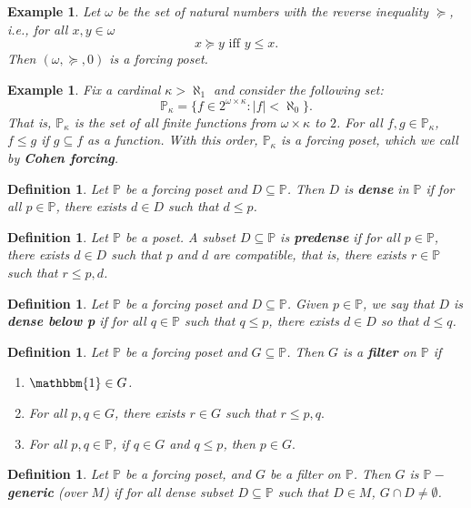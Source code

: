 \documentclass[10pt,longbibliography]{article}
\newtheorem{Def}[Theo]{Definition}
\newtheorem{Ex}[Theo]{Example}
\newcommand{\One}{\mathbbm{1}}
\newcommand{\Po}{\mathbb{P}}
\newcommand{\N}{\omega}
\newcommand{\Pk}{\mathbb{P}_{\kappa}}
\begin{document}
\begin{Ex}
	Let $\N$ be the set of natural numbers with the reverse inequality $\succcurlyeq$, i.e., for all $x,y \in \N$
	$$x \succcurlyeq y \text{ iff } y \leq x.$$
	Then $(\N,\succcurlyeq,0)$ is a forcing poset.
\end{Ex}

\begin{Ex}\label{Cohenforcingdef}
	Fix a cardinal $\kappa > \aleph_{1}$ and consider the following set:
	$$\Pk= \{ f \in 2^{\omega \times \kappa}: |f| < \aleph_{0} \}.$$
	That is, $\Pk$ is the set of all finite functions from $ \omega \times \kappa$ to $2$. For all $f,g \in \Pk$, $f \leq g$ if $g \subseteq f$ as a function. With this order, $\Pk$ is a forcing poset, which we call by \textbf{Cohen forcing}.
\end{Ex}

\begin{Def}
	Let $\Po$ be a forcing poset and $D \subseteq \Po$. Then $D$ is \textbf{dense} in $\Po$ if for all $p \in \Po$, there exists $d \in D$ such that $d \leq p$. 
\end{Def}

\begin{Def}
	Let $\Po$ be a poset. A subset $D \subseteq \Po$ is \textbf{predense} if for all $p \in \Po$, there exists $d \in D$ such that $p$ and $d$ are compatible, that is, there exists $r \in \Po$ such that $r \leq p,d$.
\end{Def}


\begin{Def}
	Let $\Po$ be a forcing poset and $D \subseteq \Po$. Given $p \in \Po$, we say that $D$ is \textbf{dense below p} if for all $q \in \Po$ such that $q \leq p$, there exists $d \in D$ so that $d \leq q$.
\end{Def}

\begin{Def}
	Let $\Po$ be a forcing poset and $G \subseteq \Po$. Then $G$ is a \textbf{filter} on $\Po$ if
	
	\begin{enumerate}
		\item $\One \in G$.
		\item For all $p,q \in G$, there exists $r \in G$ such that $r \leq p,q.$
		\item For all $p, q \in \Po$, if $q \in G$ and $q \leq p$, then $p \in G.$
	\end{enumerate}
\end{Def}

\begin{Def}
	Let $\Po$ be a forcing poset, and $G$ be a filter on $\Po$. Then $G$ is $\Po-$\textbf{generic} (over $M$) if for all dense subset $ D \subseteq \Po$ such that $D \in M$, $G \cap D \neq \emptyset$.
	
\end{Def}
\end{document}
